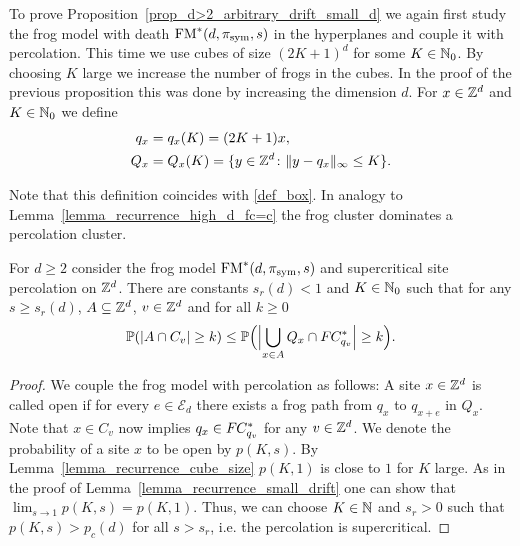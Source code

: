 
To prove Proposition~\ref{prop_d>2_arbitrary_drift_small_d} we again first study the frog model with death $\operatorname{FM}^*(d, \pi_{\text{sym}},s)$ in the hyperplanes and couple it with percolation. This time we use cubes of size $(2K+1)^{d}$ for some $K \in \mathbb{N}_0$. By choosing $K$ large we increase the number of frogs in the cubes. In the proof of the previous proposition this was done by increasing the dimension $d$. For $x \in \mathbb{Z}^d$ and $K \in \mathbb{N}_0$ we define
\begin{align*}
 q_x &= q_x(K) = (2K+1)x, \\
 Q_x &= Q_x(K) = \{y \in \mathbb{Z}^{d} \colon \lVert y-q_x \rVert_{\infty} \leq K\}.
\end{align*}

Note that this definition coincides with \eqref{def_box}.
In analogy to Lemma~\ref{lemma_recurrence_high_d_fc=c} the frog cluster dominates a percolation cluster.

\begin{lemma}\label{lemma_frog_model_with_death_percolation_arbitrary_d}
For $d \geq 2$ consider the frog model $\operatorname{FM}^*(d,\pi_{\text{sym}},s)$ and supercritical site percolation on $\mathbb{Z}^d$. There are constants $s_r(d) < 1$ and $K \in \mathbb{N}_0$ such that for any $s \geq s_r(d)$, $A \subseteq \mathbb{Z}^d$, $v \in \mathbb{Z}^d$ and for all $k \geq 0$
\begin{equation*}
 \mathbb{P}(\lvert A \cap C_v \rvert \geq k) \leq \mathbb{P}\Bigl(\Bigl\lvert \bigcup_{x \in A}Q_x\cap F\hspace{-0.04em}C_{q_v}^*\Bigr\rvert \geq k\Bigr).
\end{equation*}
\end{lemma}

\begin{proof}
We couple the frog model with percolation as follows: A site $x \in \mathbb{Z}^{d}$ is called open if for every $e \in \mathcal{E}_{d}$ there exists a frog path from $q_x$ to $q_{x + e}$ in $Q_x$. Note that $x \in C_v$ now implies $q_x \in F\hspace{-0.04em}C_{q_v}^*$ for any $v \in \mathbb{Z}^d$. We denote the probability of a site $x$ to be open by $p(K,s)$. By Lemma~\ref{lemma_recurrence_cube_size} $p(K,1)$ is close to $1$ for $K$ large. As in the proof of Lemma~\ref{lemma_recurrence_small_drift} one can show that $\lim_{s \to 1} p(K,s)= p(K,1)$. Thus, we can choose $K \in \mathbb{N}$ and $s_r >0$ such that $p(K,s) > p_c(d)$ for all $s > s_r$, i.e. the percolation is supercritical. 
\end{proof}

